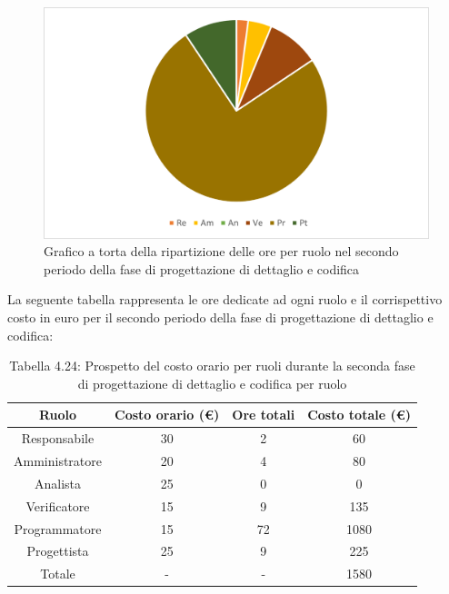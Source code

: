 \begin{figure}[H]
    \centering
    \includegraphics[scale=0.6]{img/grafi preventivo/torta/codifica/periodo2.png}
    \caption{Grafico a torta della ripartizione delle ore per ruolo nel secondo periodo della fase di progettazione di dettaglio e codifica}
\end{figure}
La seguente tabella rappresenta le ore dedicate ad ogni ruolo e il corrispettivo costo in euro per il secondo periodo della fase di progettazione di dettaglio e codifica:
\begin{table}[h]
	\setlength\extrarowheight{5pt}
	\centering
	\begin{tabularx}{\textwidth}{|ccc|c|}
		\hline
		\rowcolor{white}
		\textbf{Ruolo} & \textbf{Costo orario (€)} & \textbf{Ore totali} & \textbf{Costo totale (€)} \\
		\hline
		Responsabile &30&2&60 \\
		Amministratore &20&4&80 \\
		Analista &25&0&0 \\
		Verificatore &15&9&135 \\
		Programmatore &15&72&1080 \\
		Progettista &25&9&225 \\
		\hline
		Totale &-&-&1580 \\
		\hline
	\end{tabularx}
    \vspace{10pt}
	\caption{Tabella 4.24: Prospetto del costo orario per ruoli durante la seconda fase di progettazione di dettaglio e codifica per ruolo}
\end{table}
%
\newpage
